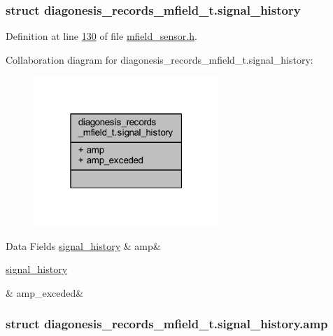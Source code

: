 \label{d4/d27/a00392}
\hypertarget{a00019_d4/d27/a00392}{}
\subsubsection{struct diagonesis\+\_\+records\+\_\+mfield\+\_\+t.\+signal\+\_\+history}


Definition at line \hyperlink{a00019_source_l00130}{130} of file \hyperlink{a00019_source}{mfield\+\_\+sensor.\+h}.



Collaboration diagram for diagonesis\+\_\+records\+\_\+mfield\+\_\+t.\+signal\+\_\+history\+:\nopagebreak
\begin{figure}[H]
\begin{center}
\leavevmode
\includegraphics[width=199pt]{df/d9c/a00958}
\end{center}
\end{figure}
\begin{DoxyFields}{Data Fields}
\hypertarget{a00019_a162cacf0d591b432412c89437dea28e0}{\hyperlink{a00019_da/dbf/a00393}{signal\+\_\+history}}\label{a00019_a162cacf0d591b432412c89437dea28e0}
&
amp&
\\
\hline

\hypertarget{a00019_a354a257167178900099e74081c572fda}{\hyperlink{a00019_d9/dad/a00394}{signal\+\_\+history}}\label{a00019_a354a257167178900099e74081c572fda}
&
amp\+\_\+exceded&
\\
\hline

\end{DoxyFields}
\label{da/dbf/a00393}
\hypertarget{a00019_da/dbf/a00393}{}
\subsubsection{struct diagonesis\+\_\+records\+\_\+mfield\+\_\+t.\+signal\+\_\+history.\+amp}


